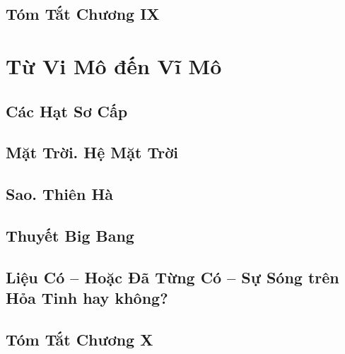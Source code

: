 \documentclass{article}
\numberwithin{equation}{section}
\begin{document}

\subsection{Tóm Tắt Chương IX}


\section{Từ Vi Mô đến Vĩ Mô}

\subsection{Các Hạt Sơ Cấp}


\subsection{Mặt Trời. Hệ Mặt Trời}


\subsection{Sao. Thiên Hà}


\subsection{Thuyết Big Bang}


\subsection{Liệu Có -- Hoặc Đã Từng Có -- Sự Sóng trên Hỏa Tinh hay không?}

\subsection{Tóm Tắt Chương X}


\printbibliography[heading=bibintoc]
	
\end{document}
